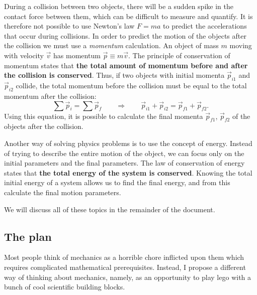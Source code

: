 \documentclass[letterpaper,9pt,journal]{IEEEtran}
\begin{document}



During a collision between two objects, 
there will be a sudden spike in the contact force between them,
which can be difficult to measure and quantify.
It is therefore not possible to use Newton's law $F=ma$ to predict the accelerations that occur during collisions.
In order to predict the motion of the objects after the collision we must use a \emph{momentum} calculation.
An object of mass $m$ moving with velocity $\vec{v}$ has momentum $\vec{p}\equiv m\vec{v}$.
The principle of conservation of momentum states that {\bf the total amount of momentum before and
after the collision is conserved}. Thus, if two objects with initial momenta $\vec{p}_{i1}$ and $\vec{p}_{i2}$ collide,
the total momentum before the collision must be equal to the total momentum after the collision:
\[
	\sum \vec{p}_i = \sum \vec{p}_f 	
	\qquad
	\Rightarrow
	\qquad
	\vec{p}_{i1} + \vec{p}_{i2} 
		=
		\vec{p}_{f1} + \vec{p}_{f2}.
\]
Using this equation, it is possible to calculate the final momenta $\vec{p}_{f1}$, $\vec{p}_{f2}$
of the objects after the collision. 


Another way of solving physics problems is to use the concept of energy.
Instead of trying to describe the entire motion of the object, 
we can focus only on the initial parameters and the final parameters.
The law of conservation of energy states that {\bf the total energy of the system is conserved}.
Knowing the total initial energy of a system allows us to find the final energy,
and from this calculate the final motion parameters.

We will discuss all of these topics in the remainder of the document.

\vspace{-1mm}
\subsection{The plan}

Most people think of mechanics as a horrible chore inflicted upon them
which requires complicated mathematical prerequisites.
Instead, I propose a different way of thinking about mechanics,
namely, as an opportunity to play {\sc lego} with a bunch of cool
scientific building blocks.
%
\end{document}
